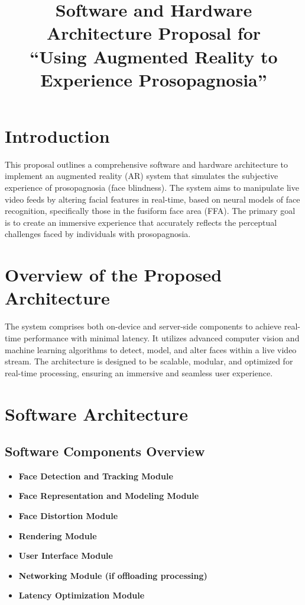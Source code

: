 \documentclass{article}
\begin{document}
\title{Software and Hardware Architecture Proposal for\\``Using Augmented Reality to Experience Prosopagnosia''}
\author{}
\date{}
\maketitle

\section*{Introduction}

This proposal outlines a comprehensive software and hardware architecture to implement an augmented reality (AR) system that simulates the subjective experience of prosopagnosia (face blindness). The system aims to manipulate live video feeds by altering facial features in real-time, based on neural models of face recognition, specifically those in the fusiform face area (FFA). The primary goal is to create an immersive experience that accurately reflects the perceptual challenges faced by individuals with prosopagnosia.

\section*{Overview of the Proposed Architecture}

The system comprises both on-device and server-side components to achieve real-time performance with minimal latency. It utilizes advanced computer vision and machine learning algorithms to detect, model, and alter faces within a live video stream. The architecture is designed to be scalable, modular, and optimized for real-time processing, ensuring an immersive and seamless user experience.

\section{Software Architecture}

\subsection{Software Components Overview}

\begin{itemize}
    \item \textbf{Face Detection and Tracking Module}
    \item \textbf{Face Representation and Modeling Module}
    \item \textbf{Face Distortion Module}
    \item \textbf{Rendering Module}
    \item \textbf{User Interface Module}
    \item \textbf{Networking Module (if offloading processing)}
    \item \textbf{Latency Optimization Module}
\end{itemize}
\end{document}
